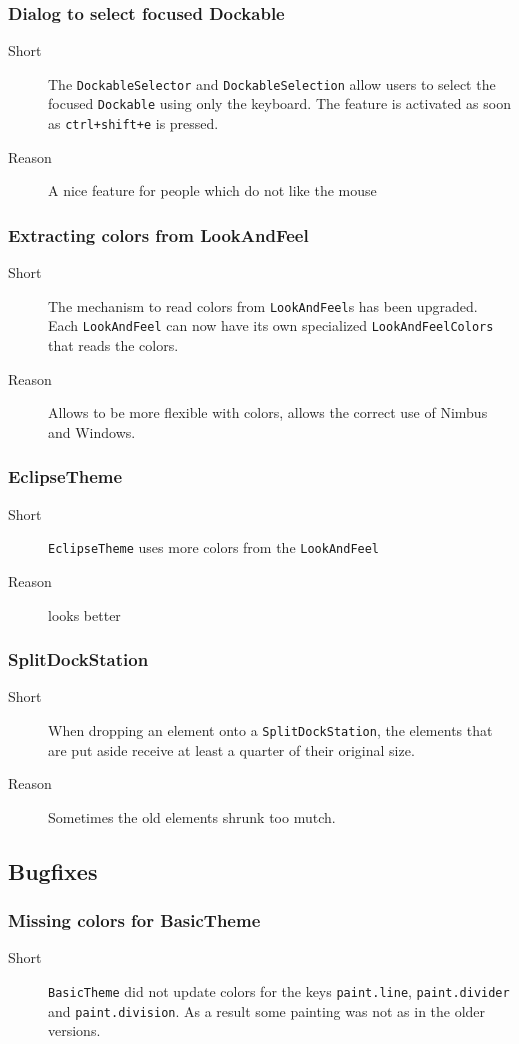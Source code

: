 \documentclass[a4paper,10pt]{article}
\newcommand{\src}[1]{\lstinline[basicstyle=\normalsize\ttfamily,keywordstyle=\normalsize\ttfamily,identifierstyle=\normalsize\ttfamily]|#1|}
\newcommand{\short}{\item[Short]}
\newcommand{\why}{\item[Reason]}
\begin{document}
\subsubsection{Dialog to select focused Dockable}
\begin{description}
 \short The \src{DockableSelector} and \src{DockableSelection} allow users to select the focused \src{Dockable} using only the keyboard. The feature is activated as soon as \src{ctrl+shift+e} is pressed.
 \why A nice feature for people which do not like the mouse
\end{description}

\subsubsection{Extracting colors from LookAndFeel}
\begin{description}
 \short The mechanism to read colors from \src{LookAndFeel}s has been upgraded. Each \src{LookAndFeel} can now have its own specialized \src{LookAndFeelColors} that reads the colors.
 \why Allows to be more flexible with colors, allows the correct use of Nimbus and Windows.
\end{description}

\subsubsection{EclipseTheme}
\begin{description}
 \short \src{EclipseTheme} uses more colors from the \src{LookAndFeel}
 \why looks better
\end{description}

\subsubsection{SplitDockStation}
\begin{description}
 \short When dropping an element onto a \src{SplitDockStation}, the elements that are put aside receive at least a quarter of their original size.
 \why Sometimes the old elements shrunk too mutch.
\end{description}

\subsection{Bugfixes}
\subsubsection{Missing colors for BasicTheme}
\begin{description}
 \short \src{BasicTheme} did not update colors for the keys \src{paint.line}, \src{paint.divider} and \src{paint.division}. As a result some painting was not as in the older versions.
\end{description}
\end{document}
